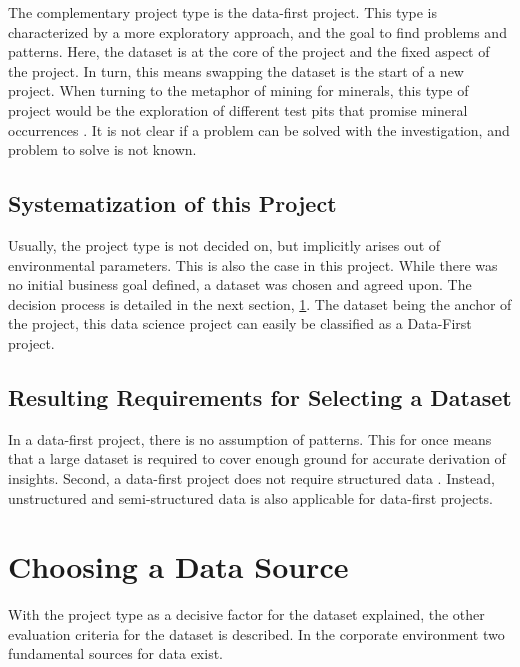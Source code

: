 	The complementary project type is the data-first project. This type is characterized by a more exploratory approach, and the goal to find problems and patterns. Here, the dataset is at the core of the project and the fixed aspect of the project. In turn, this means swapping the dataset is the start of a new project. When turning to the metaphor of mining for minerals, this type of project would be the exploration of different test pits that promise mineral occurrences \cite{dataScienceProjectTypes}. It is not clear if a problem can be solved with the investigation, and problem to solve is not known.
	
	\subsection{Systematization of this Project}
	Usually, the project type is not decided on, but implicitly arises out of environmental parameters. This is also the case in this project. While there was no initial business goal defined, a dataset was chosen and agreed upon. The decision process is detailed in the next section, \ref{data-source}. The dataset being the anchor of the project, this data science project can easily be classified as a Data-First project.
	
	\subsection{Resulting Requirements for Selecting a Dataset}
	In a data-first project, there is no assumption of patterns. This for once means that a large dataset is required to cover enough ground for accurate derivation of insights. Second, a data-first project does not require structured data \cite{srivastavaDataMining}. Instead, unstructured and semi-structured data is also applicable for data-first projects.
	
	\section{Choosing a Data Source}
	\label{data-source}
	
	With the project type as a decisive factor for the dataset explained, the other evaluation criteria for the dataset is described. In the corporate environment two fundamental sources for data exist. 
	

